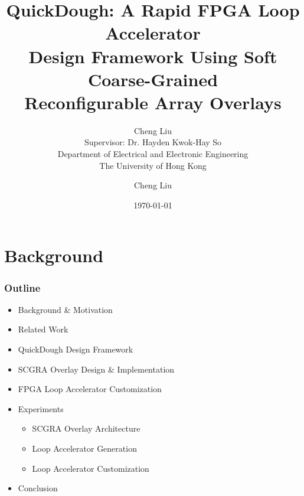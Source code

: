 \documentclass[accentcolor=tud1a,colorbacktitle,inverttitle,landscape,german,presentation,t]{tudbeamer}
\begin{document}
\title[QuickDough]{QuickDough: A Rapid FPGA Loop Accelerator \\ Design Framework Using Soft Coarse-Grained
\\Reconfigurable Array Overlays}
\vspace{1.5ex}
\subtitle{Cheng Liu\\Supervisor: Dr. Hayden Kwok-Hay So \\
    \vspace{1.5ex} Department of Electrical and Electronic
Engineering \\ The University of Hong Kong}

\author[Cheng Liu]{Cheng Liu}


\date{\today}

\begin{titleframe}
\end{titleframe}
\section{Background}
  \begin{frame}
  \frametitle{Outline}
  \begin{itemize}
  \setlength{\itemsep}{6pt}
  \item Background \& Motivation
  \item Related Work
  \item QuickDough Design Framework
  \item SCGRA Overlay Design \& Implementation
  \item FPGA Loop Accelerator Customization
  \item Experiments
  \begin{itemize}
    \setlength{\itemsep}{6pt}
    \item SCGRA Overlay Architecture
    \item Loop Accelerator Generation
    \item Loop Accelerator Customization
  \end{itemize}
  \item Conclusion
  \end{itemize}
  \end{frame}
\end{document}
